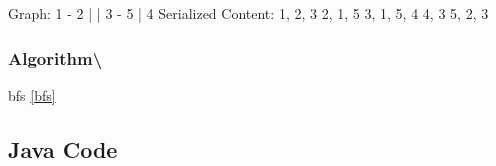 \documentclass[]{book}
\newenvironment{Shaded}{\begin{snugshade}}{\end{snugshade}}
\newcommand{\DecValTok}[1]{\textcolor[rgb]{0.00,0.00,0.81}{#1}}
\newcommand{\NormalTok}[1]{#1}
\begin{document}
\begin{Shaded}
\begin{Highlighting}[]
\NormalTok{Graph:}
\DecValTok{1}\NormalTok{ - }\DecValTok{2}
\NormalTok{|   |}
\DecValTok{3}\NormalTok{ - }\DecValTok{5}
\NormalTok{|}
\DecValTok{4}
\NormalTok{Serialized Content:}
\DecValTok{1}\NormalTok{, }\DecValTok{2}\NormalTok{, }\DecValTok{3}
\DecValTok{2}\NormalTok{, }\DecValTok{1}\NormalTok{, }\DecValTok{5}
\DecValTok{3}\NormalTok{, }\DecValTok{1}\NormalTok{, }\DecValTok{5}\NormalTok{, }\DecValTok{4}
\DecValTok{4}\NormalTok{, }\DecValTok{3}
\DecValTok{5}\NormalTok{, }\DecValTok{2}\NormalTok{, }\DecValTok{3}
\end{Highlighting}
\end{Shaded}

\hypertarget{algorithm-104}{%
\subsubsection{Algorithm\textbackslash{}}\label{algorithm-104}}

bfs \ref{bfs}

\hypertarget{java-code-59}{%
\subsection{Java Code}\label{java-code-59}}
\end{document}
